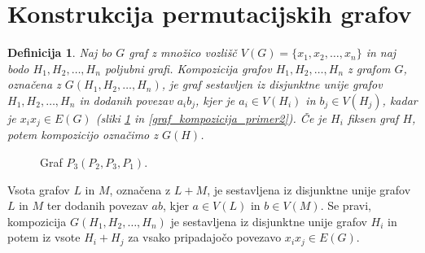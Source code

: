 \documentclass[a4paper, 12pt]{book}
\newtheorem{definicija}{Definicija}[chapter]
\begin{document}
\section{ Konstrukcija permutacijskih grafov}

\begin{definicija}
    Naj bo $G$ graf z množico vozlišč $V(G) = \{x_1, x_2, \dots, x_n\}$ in naj bodo $H_1, H_2, \dots, H_n$ poljubni grafi. Kompozicija grafov $H_1, H_2, \dots, H_n$ z grafom $G$, označena z $G(H_1, H_2, \dots, H_n)$, je graf sestavljen iz disjunktne unije grafov $H_1, H_2, \dots, H_n$ in dodanih povezav $a_ib_j$, kjer je $a_i \in V(H_i)$ in $b_j \in V(H_j)$, kadar je $x_ix_j \in E(G)$ (sliki \ref{graf_kompozicija_primer1} in \ref{graf_kompozicija_primer2}). Če je $H_i$ fiksen graf $H$, potem kompozicijo označimo z $G(H)$. 
\end{definicija}

\begin{figure}[h]
    \begin{center}        
    \end{center}
    \caption{Graf $P_3(P_2, P_3, P_1)$.}
    \label{graf_kompozicija_primer1}
\end{figure}

Vsota grafov $L$ in $M$, označena z $L + M$, je sestavljena iz disjunktne unije grafov $L$ in $M$ ter dodanih povezav $ab$, kjer $a \in V(L)$ in $b \in V(M)$. Se pravi, kompozicija $G(H_1, H_2, \dots, H_n)$ je sestavljena iz disjunktne unije grafov $H_i$ in potem iz vsote $H_i + H_j$ za vsako pripadajočo povezavo $x_ix_j \in E(G)$.
\end{document}
